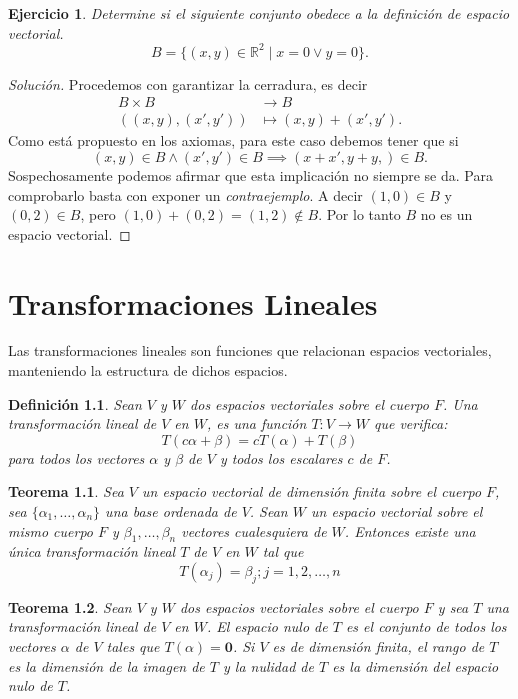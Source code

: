 \documentclass[b5paper, 11pt]{book}
\newcommand{\0}{\mathbf{0}}
\newcommand{\R}{\mathds{R}}
\theoremstyle{estiloB}
\theoremstyle{estiloC}
\newtheorem{unteo}{Teorema}[chapter]
\newtheorem{unadefi}{Definición}[chapter]
\theoremstyle{estiloD}
\theoremstyle{estiloE}
\newtheorem{ejer}{Ejercicio}[chapter]
\begin{document}
\begin{ejer}
Determine si el siguiente conjunto obedece a la definición de espacio vectorial.
\[
B= \{ (x,y) \in \R^{2} \; | \; x=0 \vee y=0 \}.
\]
\end{ejer}
\begin{proof}[Solución] Procedemos con garantizar la cerradura, es decir
\begin{align*}
B \times B &\to B\\
((x,y), (x',y')) &\mapsto (x,y)+ (x',y').
\end{align*}
Como está propuesto en los axiomas, para este caso debemos tener que si
\[
(x,y) \in B \wedge (x',y') \in B \implies (x+ x', y+ y,) \in B.
\]
Sospechosamente podemos afirmar que esta implicación no siempre se da. Para comprobarlo basta con exponer un \textit{contraejemplo}. A decir $(1,0) \in B$ y $(0,2) \in B$, pero $(1,0)+ (0,2)= (1,2) \not\in B$. Por lo tanto $B$ no es un espacio vectorial.
\end{proof}

\chapter{Transformaciones Lineales}
Las transformaciones lineales son funciones que relacionan espacios vectoriales, manteniendo la estructura de dichos espacios.
\begin{unadefi}
Sean $V$ y $W$ dos espacios vectoriales sobre el cuerpo $F$. Una \textit{transformaci\'on lineal} de $V$ en $W$, es una funci\'on $T: V \to W $ que verifica:
\[
T(c\alpha +\beta) = cT(\alpha) + T(\beta)
\]
para todos los vectores $\alpha$ y $\beta$ de $V$ y todos los escalares $c$ de $F$.
\end{unadefi}

\begin{unteo}
Sea $V$ un espacio vectorial de dimensi\'on finita sobre el cuerpo $F$, sea $\{\alpha_{1}, \ldots ,\alpha_{n}\}$ una base ordenada de $V$. Sean $W$ un espacio vectorial sobre el mismo cuerpo $F$ y $\beta_{1},\ldots ,\beta_{n}$ vectores cualesquiera de $W$. Entonces existe una \'unica transformaci\'on lineal $T$ de $V$ en $W$ tal que
\[
T(\alpha_{j}) = \beta_{j} ; j=1,2,\ldots ,n 
\]
\end{unteo}

\begin{unteo}
Sean $V$ y $W$ dos espacios vectoriales sobre el cuerpo $F$ y sea $T$ una transformaci\'on lineal de $V$ en $W$. El \textit{espacio nulo} de $T$ es el conjunto de todos los vectores $\alpha$ de $V$ tales que $T(\alpha) = \0$. Si $V$ es de dimensi\'on finita, el \textit{rango} de $T$ es la dimensi\'on de la imagen de $T$ y la \textit{nulidad} de $T$ es la dimensi\'on del espacio nulo de $T$.
\end{unteo}
\end{document}
